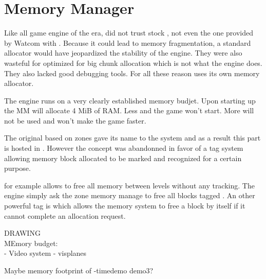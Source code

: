 \section{Memory Manager}
Like all game engine of the era, \doom did not trust stock , not even the one provided by Watcom with . Because it could lead to memory fragmentation, a standard allocator would have jeopardized the stability of the engine. They were also wasteful for optimized for big chunk allocation which is not what the engine does. They also lacked good debugging tools. For all these reason \doom uses its own memory allocator.\\
\par

The engine runs on a very clearly established memory budjet. Upon starting up the MM will allocate 4 MiB of RAM. Less and the game won't start. More will not be used and won't make the game faster.\\
\par
The original based on zones gave its name to the system and as a result this part is hosted in . However the concept was abandonned in favor of a tag system allowing memory block allocated to be marked and recognized for a certain purpose.\\
\par
{}
\par
{} for example allows \doom to free all memory between levels without any tracking. The engine simply ask the zone memory manage to free all blocks tagged . An other powerful tag is  which allows the memory system to free a block by itself if it cannot complete an allocation request. \\
\par
  
\par
{}
\par

\pagebreak
DRAWING\\
MEmory budget:\\
- Video system
- visplanes
\par
Maybe memory footprint of -timedemo demo3?\\
\pagebreak
